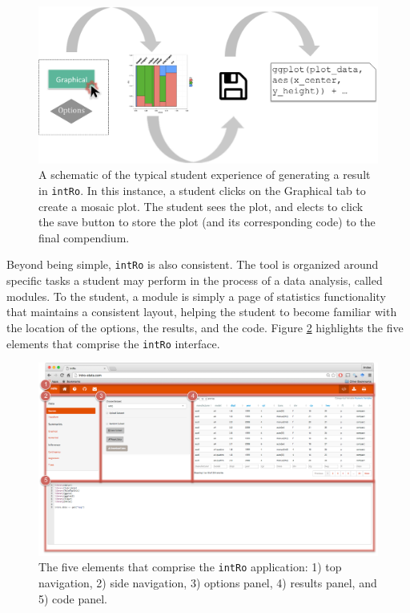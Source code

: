 \documentclass[12pt,]{article}
\begin{document}
\begin{figure}[H]
\centering
\includegraphics[width=\linewidth]{images/user_experience.pdf}
\caption{A schematic of the typical student experience of generating a result in \texttt{intRo}. In this instance, a student clicks on the Graphical tab to create a mosaic plot. The student sees the plot, and elects to click the save button to store the plot (and its corresponding code) to the final compendium.}
\label{fig:user_experience}
\end{figure}

Beyond being simple, \texttt{intRo} is also consistent. The tool is
organized around specific tasks a student may perform in the process of
a data analysis, called modules. To the student, a module is simply a
page of statistics functionality that maintains a consistent layout,
helping the student to become familiar with the location of the options,
the results, and the code. Figure \ref{fig:ui} highlights the five
elements that comprise the \texttt{intRo} interface.

\begin{figure}[ht!]
\centering
\includegraphics[width=\linewidth]{images/ui_annotate.pdf}
\caption{The five elements that comprise the \texttt{intRo} application: 1) top navigation, 2) side navigation, 3) options panel, 4) results panel, and 5) code panel.}
\label{fig:ui}
\end{figure}
\end{document}
